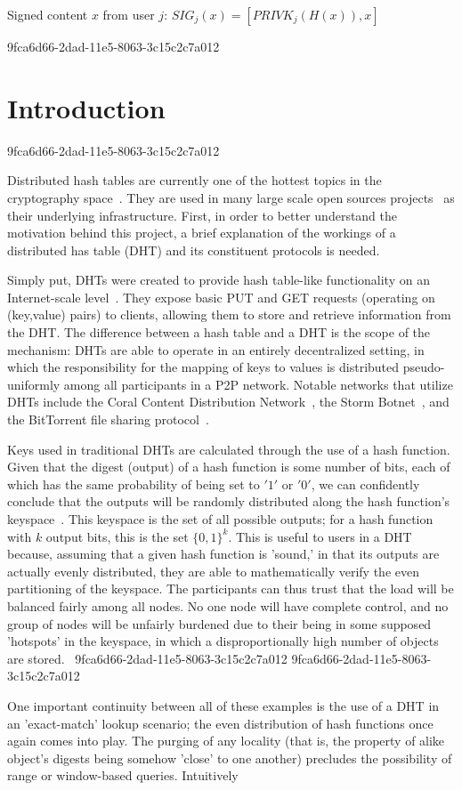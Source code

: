 \documentclass[12pt]{article}
\begin{document}
Signed content $x$ from user $j$: $SIG_j(x) = \left[ PRIVK_j( H(x) ), x \right]$

9fca6d66-2dad-11e5-8063-3c15c2c7a012\section{Introduction}
9fca6d66-2dad-11e5-8063-3c15c2c7a012\par Distributed hash tables are currently one of the hottest topics in the cryptography space~\cite{Stoica:2001dj,Rowstron:2001ea,Ratnasamy:2001wn}. They are used in many large scale open sources projects~\cite{Freitas:2013tb,Xu:2010vs,Perfitt:2010fh} as their underlying infrastructure. First, in order to better understand the motivation behind this project, a brief explanation of the workings of a distributed has table (DHT) and its constituent protocols is needed.

\par Simply put, DHTs were created to provide hash table-like functionality on an Internet-scale level~\cite{Ratnasamy:2001wn}. They expose basic PUT and GET requests (operating on (key,value) pairs) to clients, allowing them to store and retrieve information from the DHT. The difference between a hash table and a DHT is the scope of the mechanism: DHTs are able to operate in an entirely decentralized setting, in which the responsibility for the mapping of keys to values is distributed pseudo-uniformly among all participants in a P2P network. Notable networks that utilize DHTs include the Coral Content Distribution Network~\cite{Freedman:2004vb}, the Storm Botnet~\cite{Holz:2008uk}, and the BitTorrent file sharing protocol~\cite{Cohen:y1_8mBnw}.

\par Keys used in traditional DHTs are calculated through the use of a hash function. Given that the digest (output) of a hash function is some number of bits, each of which has the same probability of being set to $'1'$ or $'0'$, we can confidently conclude that the outputs will be randomly distributed along the hash function's keyspace~. This keyspace is the set of all possible outputs; for a hash function with $k$ output bits, this is the set $\{0,1\}^k$. This is useful to users in a DHT because, assuming that a given hash function is 'sound,' in that its outputs are actually evenly distributed, they are able to mathematically verify the even partitioning of the keyspace. The participants can thus trust that the load will be balanced fairly among all nodes. No one node will have complete control, and no group of nodes will be unfairly burdened due to their being in some supposed 'hotspots' in the keyspace, in which a disproportionally high number of objects are stored.~
9fca6d66-2dad-11e5-8063-3c15c2c7a012
9fca6d66-2dad-11e5-8063-3c15c2c7a012\par One important continuity between all of these examples is the use of a DHT in an 'exact-match' lookup scenario; the even distribution of hash functions once again comes into play. The purging of any locality (that is, the property of alike object's digests being somehow 'close' to one another) precludes the possibility of range or window-based queries. Intuitively
\end{document}
